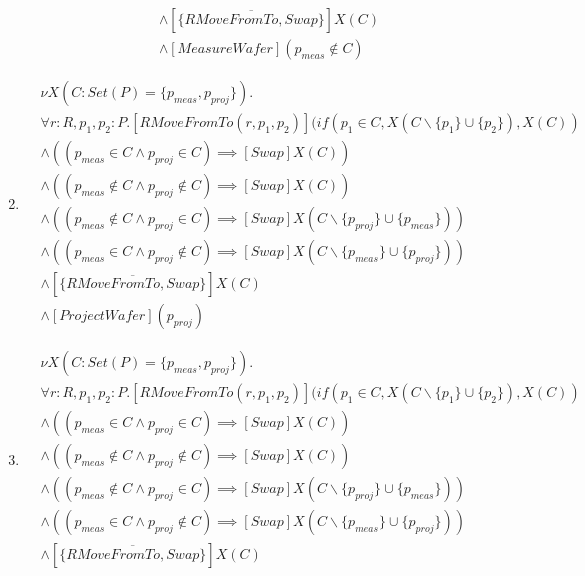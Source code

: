 \begin{enumerate}
\begin{align*}
            &\wedge [\overline{\{RMoveFromTo, Swap\}}]X(C)\\
            &\wedge [MeasureWafer](p_\mathit{meas} \notin C)
        \end{align*}
    \item \begin{align*}
    		&\nu X(C : Set(P) = \{p_\mathit{meas},p_\mathit{proj}\}).\\
            & \forall r:R, p_1, p_2 : P . [RMoveFromTo(r, p_1, p_2)](if(p_1 \in C, X(C\backslash\{p_1\}\cup\{p_2\}), X(C))\\
            &\wedge ((p_\mathit{meas} \in C \wedge p_\mathit{proj} \in C) \implies [Swap]X(C))\\
            &\wedge ((p_\mathit{meas} \notin C \wedge p_\mathit{proj} \notin C) \implies [Swap]X(C))\\
            &\wedge ((p_\mathit{meas} \notin C \wedge p_\mathit{proj} \in C) \implies [Swap]X(C\backslash\{p_\mathit{proj}\} \cup \{p_\mathit{meas}\}))\\
            &\wedge ((p_\mathit{meas} \in C \wedge p_\mathit{proj} \notin C) \implies [Swap]X(C\backslash\{p_\mathit{meas}\} \cup \{p_\mathit{proj}\}))\\
            &\wedge [\overline{\{RMoveFromTo, Swap\}}]X(C)\\
            &\wedge [ProjectWafer](p_\mathit{proj})
        \end{align*}
    \item \begin{align*}
    		&\nu X(C : Set(P) = \{p_\mathit{meas},p_\mathit{proj}\}).\\
            & \forall r:R, p_1, p_2 : P . [RMoveFromTo(r, p_1, p_2)](if(p_1 \in C, X(C\backslash\{p_1\}\cup\{p_2\}), X(C))\\
            &\wedge ((p_\mathit{meas} \in C \wedge p_\mathit{proj} \in C) \implies [Swap]X(C))\\
            &\wedge ((p_\mathit{meas} \notin C \wedge p_\mathit{proj} \notin C) \implies [Swap]X(C))\\
            &\wedge ((p_\mathit{meas} \notin C \wedge p_\mathit{proj} \in C) \implies [Swap]X(C\backslash\{p_\mathit{proj}\} \cup \{p_\mathit{meas}\}))\\
            &\wedge ((p_\mathit{meas} \in C \wedge p_\mathit{proj} \notin C) \implies [Swap]X(C\backslash\{p_\mathit{meas}\} \cup \{p_\mathit{proj}\}))\\
            &\wedge [\overline{\{RMoveFromTo, Swap\}}]X(C)\\

\end{align*}
\end{enumerate}
